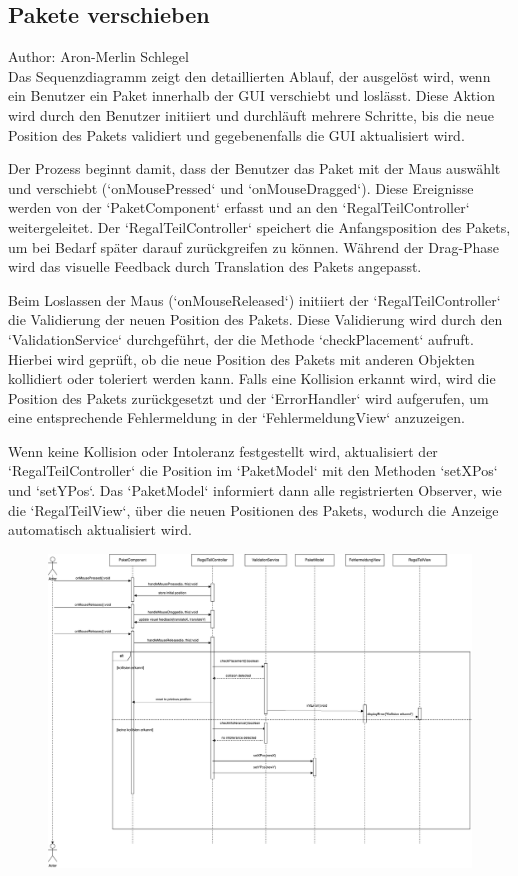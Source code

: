 \subsection{Pakete verschieben}
Author: Aron-Merlin Schlegel\\
Das Sequenzdiagramm zeigt den detaillierten Ablauf, der ausgelöst wird, wenn ein Benutzer ein Paket innerhalb der GUI verschiebt und loslässt. Diese Aktion wird durch den Benutzer initiiert und durchläuft mehrere Schritte, bis die neue Position des Pakets validiert und gegebenenfalls die GUI aktualisiert wird.

Der Prozess beginnt damit, dass der Benutzer das Paket mit der Maus auswählt und verschiebt (`onMousePressed` und `onMouseDragged`). Diese Ereignisse werden von der `PaketComponent` erfasst und an den `RegalTeilController` weitergeleitet. Der `RegalTeilController` speichert die Anfangsposition des Pakets, um bei Bedarf später darauf zurückgreifen zu können. Während der Drag-Phase wird das visuelle Feedback durch Translation des Pakets angepasst.

Beim Loslassen der Maus (`onMouseReleased`) initiiert der `RegalTeilController` die Validierung der neuen Position des Pakets. Diese Validierung wird durch den `ValidationService` durchgeführt, der die Methode `checkPlacement` aufruft. Hierbei wird geprüft, ob die neue Position des Pakets mit anderen Objekten kollidiert oder toleriert werden kann. Falls eine Kollision erkannt wird, wird die Position des Pakets zurückgesetzt und der `ErrorHandler` wird aufgerufen, um eine entsprechende Fehlermeldung in der `FehlermeldungView` anzuzeigen.

Wenn keine Kollision oder Intoleranz festgestellt wird, aktualisiert der `RegalTeilController` die Position im `PaketModel` mit den Methoden `setXPos` und `setYPos`. Das `PaketModel` informiert dann alle registrierten Observer, wie die `RegalTeilView`, über die neuen Positionen des Pakets, wodurch die Anzeige automatisch aktualisiert wird.

\begin{figure}[H]
    \includegraphics[width=\linewidth]{images/laufzeitsicht/SequenzdiagrammPaketVerschieben.drawio.png}
    \label{fig:PaketVerschiebenLaufzeit}
\end{figure}

